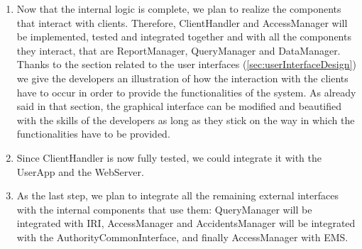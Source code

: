 \begin{enumerate}
			\item Now that the internal logic is complete, we plan to realize the components that interact with clients. Therefore, ClientHandler and AccessManager will be implemented, tested and integrated together and with all the components they interact, that are ReportManager, QueryManager and DataManager. Thanks to the section related to the user interfaces (\ref{sec:userInterfaceDesign}) we give the developers an illustration of how the interaction with the clients have to occur in order to provide the functionalities of the system. As already said in that section, the graphical interface can be modified and beautified with the skills of the developers as long as they stick on the way in which the functionalities have to be provided.
			
			\item Since ClientHandler is now fully tested, we could integrate it with the UserApp and the WebServer.
			
			\item As the last step, we plan to integrate all the remaining external interfaces with the internal components that use them: QueryManager will be integrated with IRI, AccessManager and AccidentsManager will be integrated with the AuthorityCommonInterface, and finally AccessManager with EMS. 
		\end{enumerate}